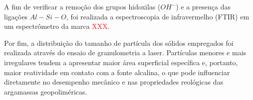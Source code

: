 A fim de verificar a remoção dos grupos hidoxilas ($OH^-$) e a presença das ligações $Al-Si-O$, foi realizada a espectroscopia de infravermelho (FTIR) em um espectrômetro da marca \textcolor{red}{XXX}.

Por fim, a distribuição do tamanho de partícula dos sólidos empregados foi realizada através do ensaio de granulometria a laser. Partículas menores e mais irregulares tendem a apresentar maior área superficial específica e, portanto, maior reatividade em contato com a fonte alcalina, o que pode influenciar diretamente no desempenho mecânico e nas propriedades reológicas das argamassas geopoliméricas.


